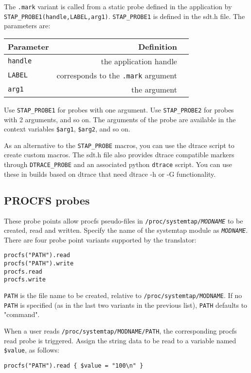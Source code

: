\documentclass[twoside,english]{article}
\newenvironment{vindent}
{\begin{list}{}{\setlength{\listparindent}{6pt}}
\item[]}
{\end{list}}
\begin{document}
The \texttt{.mark} variant is called from a static probe defined in
the application by
\texttt{STAP\_PROBE1(handle,LABEL,arg1)}. \texttt{STAP\_PROBE1} is
defined in the sdt.h file.  The parameters are:


\begin{tabular}{|l|r|c|}
  Parameter & Definition \\ \hline
  \texttt{handle} & the application handle \\ \hline
  \texttt{LABEL} & corresponds to the \texttt{.mark} argument \\ \hline
  \texttt{arg1} & the argument \\ \hline
\end{tabular}


Use \texttt{STAP\_PROBE1} for probes with one argument.  Use
\texttt{STAP\_PROBE2} for probes with 2 arguments, and so on.  The
arguments of the probe are available in the context variables
\texttt{\$arg1}, \texttt{\$arg2}, and so on.

As an alternative to the \texttt{STAP\_PROBE} macros, you can use the
dtrace script to create custom macros. The sdt.h file also provides
dtrace compatible markers through \texttt{DTRACE\_PROBE} and an
associated python \texttt{dtrace} script.  You can use these in builds
based on dtrace that need dtrace -h or -G functionality.

\subsection{PROCFS probes}
These probe points allow procfs pseudo-files in
\texttt{/proc/systemtap/\textit{MODNAME}} to be created, read and
written.  Specify the name of the systemtap module as
\texttt{\textit{MODNAME}}.  There are four probe point variants
supported by the translator:
\begin{vindent}
\begin{verbatim}
procfs("PATH").read
procfs("PATH").write
procfs.read
procfs.write
\end{verbatim}
\end{vindent}

\texttt{PATH} is the file name to be created, relative to
\texttt{/proc/systemtap/MODNAME}.  If no \texttt{PATH} is specified
(as in the last two variants in the previous list), \texttt{PATH}
defaults to "command".

When a user reads \texttt{/proc/systemtap/MODNAME/PATH}, the
corresponding procfs read probe is triggered.  Assign the string data
to be read to a variable named \texttt{\$value}, as follows:
\begin{vindent}
\begin{verbatim}
procfs("PATH").read { $value = "100\n" }
\end{verbatim}
\end{vindent}
\end{document}
